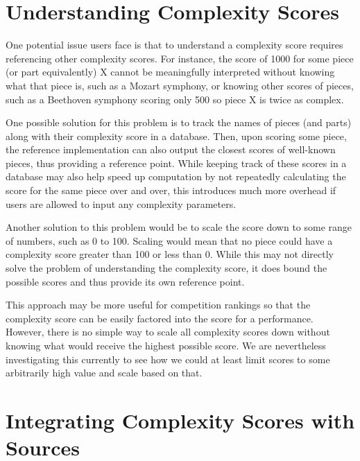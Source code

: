 \documentclass[12pt]{report}
\begin{document}
\section{Understanding Complexity Scores}
\label{sec:understand}

One potential issue users face is that to understand a complexity score requires referencing other complexity scores. For instance, the score of 1000 for some piece (or part equivalently) X cannot be meaningfully interpreted without knowing what that piece is, such as a Mozart symphony, or knowing other scores of pieces, such as a Beethoven symphony scoring only 500 so piece X is twice as complex.

One possible solution for this problem is to track the names of pieces (and parts) along with their complexity score in a database. Then, upon scoring some piece, the reference implementation can also output the closest scores of well-known pieces, thus providing a reference point. While keeping track of these scores in a database may also help speed up computation by not repeatedly calculating the score for the same piece over and over, this introduces much more overhead if users are allowed to input any complexity parameters.

Another solution to this problem would be to scale the score down to some range of numbers, such as 0 to 100. Scaling would mean that no piece could have a complexity score greater than 100 or less than 0. While this may not directly solve the problem of understanding the complexity score, it does bound the possible scores and thus provide its own reference point.

This approach may be more useful for competition rankings so that the complexity score can be easily factored into the score for a performance. However, there is no simple way to scale all complexity scores down without knowing what would receive the highest possible score. We are nevertheless investigating this currently to see how we could at least limit scores to some arbitrarily high value and scale based on that.

\section{Integrating Complexity Scores with Sources}
\label{sec:integration}
\end{document}
